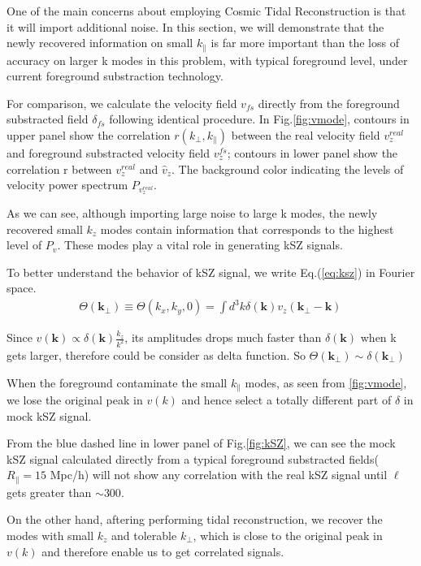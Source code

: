 One of the main concerns about employing Cosmic Tidal Reconstruction is that it will import additional noise.
In this section, we will demonstrate that 
the newly recovered information on small $k_\parallel$ is far
more important than the loss of accuracy on larger k modes in this
problem, with typical foreground level, under current foreground substraction technology.

For comparison, we calculate the velocity field $v_{fs}$
directly from the foreground substracted field $\delta_{fs}$ following identical procedure.
In Fig.\ref{fig:vmode}, contours in upper panel show the 
correlation $r(k_\perp,k_\parallel)$ between the real velocity field
$v_z^{real}$ and foreground substracted velocity field $v_z^{fs}$; 
contours in lower panel show the
correlation r between $v_z^{real}$ and $\hat v_z$. 
The background color indicating the levels of velocity power spectrum
$P_{v_z^{real}}$. 

As we can see, although importing large noise to large k modes, 
the newly recovered small $k_z$ modes contain information that
corresponds to the highest level of $P_{v}$. 
These modes play a vital role in generating kSZ signals.

To better understand the behavior of kSZ signal, we write Eq.(\ref{eq:ksz}) in Fourier space.
\begin{eqnarray}
\Theta(\bm{k_\perp})\equiv \Theta(k_x,k_y,0)=\int d^3k \delta(\bm{k}) v_z(\bm{k_\perp}-\bm{k})\,
\end{eqnarray}

Since $v(\bm{k})\propto \delta(\bm{k})\frac{k_z}{k^2}$, 
its amplitudes drops much faster than $\delta(\bm{k})$ when k gets larger, 
therefore could be consider as delta function. So $\Theta(\bm{k_\perp})\sim\delta(\bm{k_\perp})$

When the foreground contaminate the small $k_\parallel$ modes, as seen
from \ref{fig:vmode}, we lose the original peak in $v(k)$ and hence
select a totally different part of $\delta$ in mock kSZ signal.

From the blue dashed line in lower panel of Fig.\ref{fig:kSZ}, we can see the mock kSZ
signal calculated directly from a typical foreground substracted
fields($R_\parallel=15$ Mpc/h) will not
show any correlation with the real kSZ signal until $\ell$ gets greater
than $\sim300$.

On the other hand, aftering performing tidal reconstruction, we
recover the modes with small $k_z$ and tolerable $k_\perp$, 
which is close to the original peak in $v(k)$ and therefore enable us to get correlated signals.


